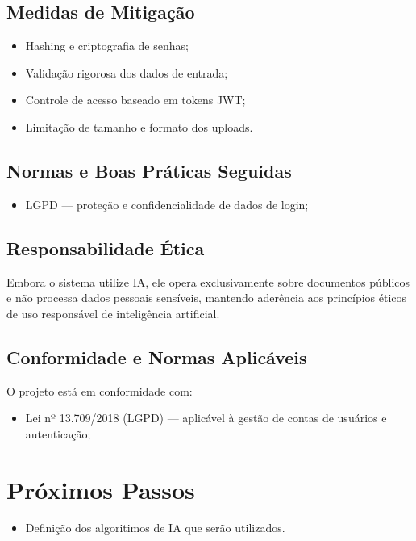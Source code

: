 \documentclass[a4paper,12pt]{article}
\begin{document}
\subsection{Medidas de Mitigação}
\begin{itemize}
    \item Hashing e criptografia de senhas;
    \item Validação rigorosa dos dados de entrada;
    \item Controle de acesso baseado em tokens JWT;
    \item Limitação de tamanho e formato dos uploads.
\end{itemize}

\subsection{Normas e Boas Práticas Seguidas}
\begin{itemize}
    \item LGPD — proteção e confidencialidade de dados de login;
\end{itemize}

\subsection{Responsabilidade Ética}
Embora o sistema utilize IA, ele opera exclusivamente sobre documentos
públicos e não processa dados pessoais sensíveis, mantendo aderência aos
princípios éticos de uso responsável de inteligência artificial.

\subsection{Conformidade e Normas Aplicáveis}
O projeto está em conformidade com:
\begin{itemize}
    \item Lei nº 13.709/2018 (LGPD) — aplicável à gestão de contas de
usuários e autenticação;
\end{itemize}

\section{Próximos Passos}
\begin{itemize}
  \item Definição dos algoritimos de IA que serão utilizados.
\end{itemize}
\end{document}
